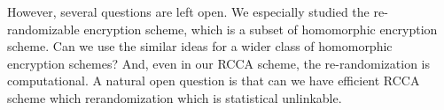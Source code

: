However, several questions are left open. 
We especially studied the re-randomizable encryption scheme, which is a subset of homomorphic encryption scheme.
Can we use the similar ideas for a wider class of homomorphic encryption schemes?
And, even in our RCCA scheme, the re-randomization is computational.
A natural open question is that can we have efficient RCCA scheme which rerandomization which is statistical unlinkable.

